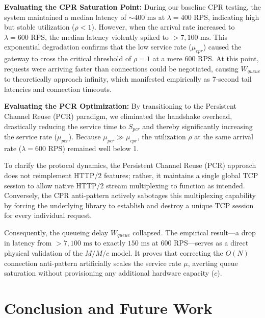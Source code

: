 \documentclass{ieeeaccess}
\begin{document}
\textbf{Evaluating the CPR Saturation Point:}
During our baseline CPR testing, the system maintained a median latency of $\sim 400 \text{ ms}$ at $\lambda = 400 \text{ RPS}$, indicating high but stable utilization ($\rho < 1$). However, when the arrival rate increased to $\lambda = 600 \text{ RPS}$, the median latency violently spiked to $> 7,100 \text{ ms}$. This exponential degradation confirms that the low service rate ($\mu_{cpr}$) caused the gateway to cross the critical threshold of $\rho = 1$ at a mere 600 RPS. At this point, requests were arriving faster than connections could be negotiated, causing $W_{queue}$ to theoretically approach infinity, which manifested empirically as 7-second tail latencies and connection timeouts.

\textbf{Evaluating the PCR Optimization:}
By transitioning to the Persistent Channel Reuse (PCR) paradigm, we eliminated the handshake overhead, drastically reducing the service time to $S_{pcr}$ and thereby significantly increasing the service rate ($\mu_{pcr}$). Because $\mu_{pcr} \gg \mu_{cpr}$, the utilization $\rho$ at the same arrival rate ($\lambda = 600 \text{ RPS}$) remained well below 1. 

To clarify the protocol dynamics, the Persistent Channel Reuse (PCR) approach does not reimplement HTTP/2 features; rather, it maintains a single global TCP session to allow native HTTP/2 stream multiplexing to function as intended. Conversely, the CPR anti-pattern actively sabotages this multiplexing capability by forcing the underlying library to establish and destroy a unique TCP session for every individual request.

Consequently, the queueing delay $W_{queue}$ collapsed. The empirical result—a drop in latency from $> 7,100 \text{ ms}$ to exactly $150 \text{ ms}$ at 600 RPS—serves as a direct physical validation of the $M/M/c$ model. It proves that correcting the $O(N)$ connection anti-pattern artificially scales the service rate $\mu$, averting queue saturation without provisioning any additional hardware capacity ($c$).

\section{Conclusion and Future Work}
\label{sec6}
\end{document}
